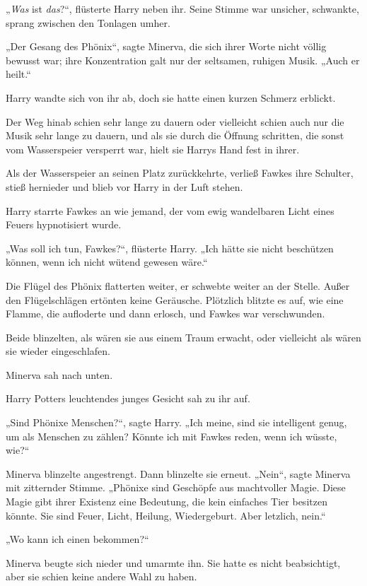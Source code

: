 {„\emph{Was} ist \emph{das}?“, flüsterte Harry neben ihr. Seine Stimme war unsicher, schwankte, sprang zwischen den Tonlagen umher.

„Der Gesang des Phönix“, sagte Minerva, die sich ihrer Worte nicht völlig bewusst war; ihre Konzentration galt nur der seltsamen, ruhigen Musik. „Auch er heilt.“

Harry wandte sich von ihr ab, doch sie hatte einen kurzen Schmerz erblickt.

Der Weg hinab schien sehr lange zu dauern oder vielleicht schien auch nur die Musik sehr lange zu dauern, und als sie durch die Öffnung schritten, die sonst vom Wasserspeier versperrt war, hielt sie Harrys Hand fest in ihrer.

Als der Wasserspeier an seinen Platz zurückkehrte, verließ Fawkes ihre Schulter, stieß hernieder und blieb vor Harry in der Luft stehen.

Harry starrte Fawkes an wie jemand, der vom ewig wandelbaren Licht eines Feuers hypnotisiert wurde.

„Was soll ich tun, Fawkes?“, flüsterte Harry. „Ich hätte sie nicht beschützen können, wenn ich nicht wütend gewesen wäre.“

Die Flügel des Phönix flatterten weiter, er schwebte weiter an der Stelle. Außer den Flügelschlägen ertönten keine Geräusche. Plötzlich blitzte es auf, wie eine Flamme, die aufloderte und dann erlosch, und Fawkes war verschwunden.

Beide blinzelten, als wären sie aus einem Traum erwacht, oder vielleicht als wären sie wieder eingeschlafen.

Minerva sah nach unten.

Harry Potters leuchtendes junges Gesicht sah zu ihr auf.

„Sind Phönixe Menschen?“, sagte Harry. „Ich meine, sind sie intelligent genug, um als Menschen zu zählen? Könnte ich mit Fawkes reden, wenn ich wüsste, wie?“

Minerva blinzelte angestrengt. Dann blinzelte sie erneut. „Nein“, sagte Minerva mit zitternder Stimme. „Phönixe sind Geschöpfe aus machtvoller Magie. Diese Magie gibt ihrer Existenz eine Bedeutung, die kein einfaches Tier besitzen könnte. Sie sind Feuer, Licht, Heilung, Wiedergeburt. Aber letzlich, nein.“

„Wo kann ich einen bekommen?“

Minerva beugte sich nieder und umarmte ihn. Sie hatte es nicht beabsichtigt, aber sie schien keine andere Wahl zu haben.

}
